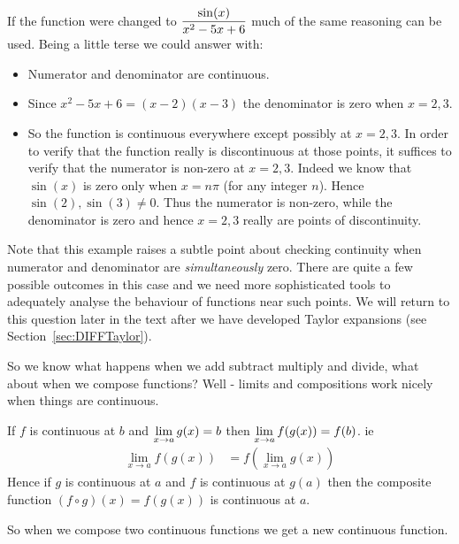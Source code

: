 \begin{eg}
If the function were changed to $\displaystyle \frac{\sin(x)}{x^2-5x+6}$ much of the same
reasoning can be used. Being a little terse we could answer with:
  \begin{itemize}
   \item Numerator and denominator are continuous.
   \item Since $x^2-5x+6=(x-2)(x-3)$ the denominator is zero when $x=2,3$.
   \item So the function is continuous everywhere except possibly
at $x=2,3$. In order to verify that the function really is discontinuous at
those points, it suffices to verify that the numerator is non-zero at $x=2,3$.
Indeed we know that $\sin(x)$ is zero only when $x = n\pi$ (for any integer
$n$). Hence $\sin(2),\sin(3) \neq 0$. Thus the numerator is non-zero, while the
denominator is zero and hence $x=2,3$ really are points of discontinuity.
\end{itemize}
Note that this example raises a subtle point about checking continuity when
numerator and denominator are \emph{simultaneously} zero. There are quite a
few possible outcomes in this case and we need more sophisticated tools to
adequately analyse the behaviour of functions near such points. We will return
to this question later in the text after we have developed Taylor expansions (see
Section~\ref{sec:DIFFTaylor}).
\end{eg}

So we know what happens when we add subtract multiply and divide, what about
when we compose functions? Well - limits and compositions work nicely when
things are continuous.
\begin{theorem}\label{thm comp cont}
  If $f$ is continuous at $b$ and $\displaystyle \lim_{x \to a} g(x) = b$ then
$\displaystyle \lim_{x\to a} f(g(x)) = f(b)$. ie
  \begin{align*}
   \lim_{x \to a} f\left( g(x) \right) &= f\left( \lim_{x \to a} g(x) \right)
  \end{align*}
Hence if $g$ is continuous at $a$ and $f$ is continuous at $g(a)$ then the
composite function $(f \circ g)(x) = f(g(x))$ is continuous at $a$.
\end{theorem}
So when we compose two continuous functions we get a new continuous function.

